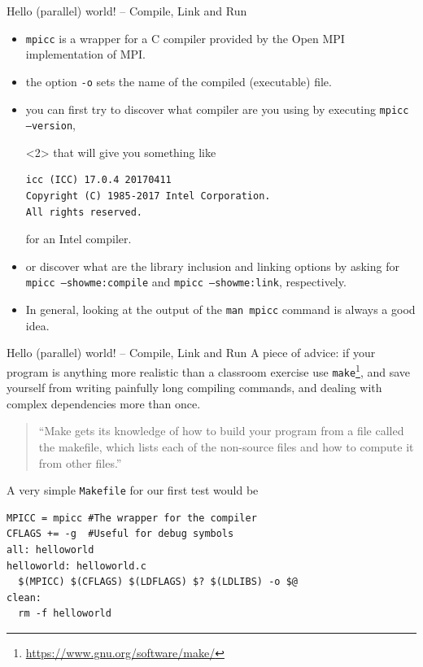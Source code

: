 \documentclass[xcolor={svgnames,usenames}]{beamer}
\begin{document}
\begin{frame}[fragile]{Hello (parallel) world! -- Compile, Link and Run}
\begin{itemize}
	\item \texttt{mpicc} is a wrapper for a C compiler provided by the Open MPI implementation of MPI.
	\item the option \texttt{-o} sets the name of the compiled (executable) file.
\end{itemize}
\begin{itemize}
\item<2-> you can first try to discover what compiler are you using by executing \texttt{mpicc --version}, \begin{onlyenv}<2>
that will give you something like
\begin{verbatim}
icc (ICC) 17.0.4 20170411
Copyright (C) 1985-2017 Intel Corporation.  
All rights reserved.
\end{verbatim} 
for an Intel compiler.
\end{onlyenv}
\item<3-> or discover what are the library inclusion and linking options by asking for \texttt{mpicc --showme:compile} and \texttt{mpicc --showme:link}, respectively.
\item<4-> In general, looking at the output of the \texttt{man mpicc} command is always a good idea.
\end{itemize} 
\end{frame}

\begin{frame}[fragile]{Hello (parallel) world! -- Compile, Link and Run}
A piece of advice: if your program is anything more realistic than a classroom exercise use \texttt{make}\footnote{\url{https://www.gnu.org/software/make/}}, and save yourself from writing painfully long compiling commands, and dealing with complex dependencies more than once.

\begin{quote}
``Make gets its knowledge of how to build your program from a file called the makefile, which lists each of the non-source files and how to compute it from other files.''
\end{quote}

A very simple \texttt{Makefile} for our first test would be
\begin{verbatim}
MPICC = mpicc #The wrapper for the compiler
CFLAGS += -g  #Useful for debug symbols
all: helloworld
helloworld: helloworld.c
  $(MPICC) $(CFLAGS) $(LDFLAGS) $? $(LDLIBS) -o $@
clean:
  rm -f helloworld
\end{verbatim}
\end{frame}
\end{document}
